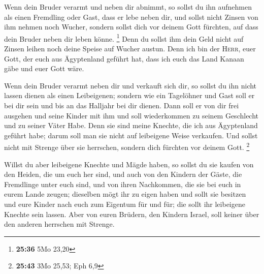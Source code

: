  Wenn dein Bruder verarmt und neben dir abnimmt, so
sollst du ihn aufnehmen als einen Fremdling oder Gast, dass er lebe
neben dir,  und sollst nicht Zinsen von ihm nehmen noch
Wucher, sondern sollst dich vor deinem Gott fürchten, auf dass dein
Bruder neben dir leben könne. \footnote{\textbf{25:36} 5Mo 23,20}
 Denn du sollst ihm dein Geld nicht auf Zinsen leihen
noch deine Speise auf Wucher austun.  Denn ich bin der
\textsc{Herr}, euer Gott, der euch aus Ägyptenland geführt hat, dass ich
euch das Land Kanaan gäbe und euer Gott wäre.

 Wenn dein Bruder verarmt neben dir und verkauft sich
dir, so sollst du ihn nicht lassen dienen als einen Leibeigenen;
 sondern wie ein Tagelöhner und Gast soll er bei dir sein
und bis an das Halljahr bei dir dienen.  Dann soll er von
dir frei ausgehen und seine Kinder mit ihm und soll wiederkommen zu
seinem Geschlecht und zu seiner Väter Habe.  Denn sie
sind meine Knechte, die ich aus Ägyptenland geführt habe; darum soll man
sie nicht auf leibeigene Weise verkaufen.  Und sollst
nicht mit Strenge über sie herrschen, sondern dich fürchten vor deinem
Gott. \footnote{\textbf{25:43} 3Mo 25,53; Eph 6,9}

 Willst du aber leibeigene Knechte und Mägde haben, so
sollst du sie kaufen von den Heiden, die um euch her sind,
 und auch von den Kindern der Gäste, die Fremdlinge unter
euch sind, und von ihren Nachkommen, die sie bei euch in eurem Lande
zeugen; dieselben mögt ihr zu eigen haben  und sollt sie
besitzen und eure Kinder nach euch zum Eigentum für und für; die sollt
ihr leibeigene Knechte sein lassen. Aber von euren Brüdern, den Kindern
Israel, soll keiner über den anderen herrschen mit Strenge.

